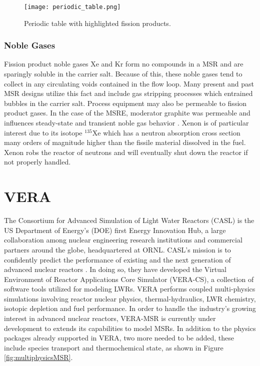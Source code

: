 \newpage

\begin{figure}[p]
  \centering
  \texttt{[image: periodic\_table.png]}\\
  \caption{Periodic table with highlighted fission products.}
  \label{fig:periodic_table_fp}
\end{figure} 

\FloatBarrier
\newpage

\subsubsection{Noble Gases}
Fission product noble gases Xe and Kr form no compounds in a MSR and are sparingly soluble in the carrier salt. Because of this, these noble gases tend to collect in any circulating voids contained in the flow loop. Many present and past MSR designs utilize this fact and include gas stripping processes which entrained bubbles in the carrier salt. Process equipment may also be permeable to fission product gases. In the case of the MSRE, moderator graphite was permeable and influences steady-state and transient noble gas behavior \cite{grimes1970}. Xenon is of particular interest due to its isotope ${}^{135}$Xe which has a neutron absorption cross section many orders of magnitude higher than the fissile material dissolved in the fuel. Xenon robs the reactor of neutrons and will eventually shut down the reactor if not properly handled. 

\section{VERA}
The Consortium for Advanced Simulation of Light Water Reactors (CASL) is the US Department of Energy's (DOE) first Energy Innovation Hub, a large collaboration among nuclear engineering research institutions and commercial partners around the globe, headquartered at ORNL. CASL's mission is to confidently predict the performance of existing and the next generation of advanced nuclear reactors \cite{casl}. In doing so, they have developed the Virtual Environment of Reactor Applications Core Simulator (VERA-CS), a collection of software tools utilized for modeling LWRs. VERA performs coupled multi-physics simulations involving reactor nuclear physics, thermal-hydraulics, LWR chemistry, isotopic depletion and fuel performance. In order to handle the industry's growing interest in advanced nuclear reactors, VERA-MSR is currently under development to extends its capabilities to model MSRs. In addition to the physics packages already supported in VERA, two more needed to be added, these include species transport and thermochemical state, as shown in Figure \ref{fig:multiphysicsMSR}.

